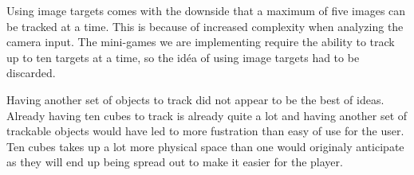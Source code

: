 Using image targets comes with the downside that a maximum of five images can be tracked at a time. This is because of increased complexity when analyzing the camera input. The mini-games we are implementing require the ability to track up to ten targets at a time, so the id\'ea of using image targets had to be discarded.

Having another set of objects to track did not appear to be the best of ideas. 
Already having ten cubes to track is already quite a lot and having another set of trackable objects would have led to more fustration than easy of use for the user.
Ten cubes takes up a lot more physical space than one would originaly anticipate as they will end up being spread out to make it easier for the player.

